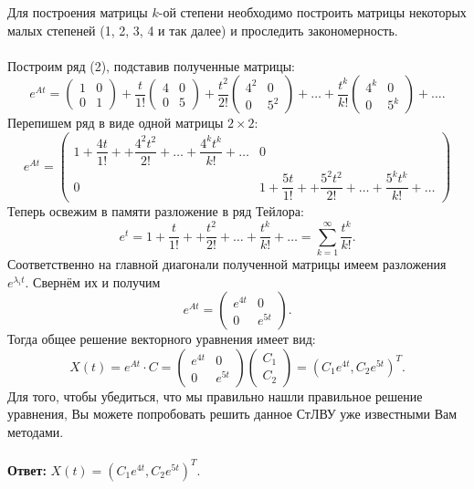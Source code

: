 \documentclass[a4paper, 12pt]{article}
\begin{document}
Для построения матрицы $k$-ой степени необходимо построить матрицы некоторых малых степеней (1, 2, 3, 4 и так далее) и проследить закономерность.\\\\
Построим ряд (2), подставив полученные матрицы:
$$e^{At} = \begin{pmatrix}
	1 & 0\\
	0 & 1
\end{pmatrix} + \dfrac{t}{1!}\begin{pmatrix}
4 & 0 \\
0 & 5
\end{pmatrix} +\dfrac{t^2}{2!}\begin{pmatrix}
4^2 & 0 \\
0 & 5^2
\end{pmatrix} + \ldots + \dfrac{t^k}{k!}\begin{pmatrix}
4^k & 0 \\
0 & 5^k
\end{pmatrix} + \ldots.$$
Перепишем ряд в виде одной матрицы $2\times2$:
$$e^{At} = \begin{pmatrix}
	1 + \dfrac{4t}{1!} + + \dfrac{4^2t^2}{2!} + \ldots + \dfrac{4^kt^k}{k!} + \ldots & 0\\
	0 &  1 + \dfrac{5t}{1!} + + \dfrac{5^2t^2}{2!} + \ldots + \dfrac{5^kt^k}{k!} + \ldots
\end{pmatrix}$$
Теперь освежим в памяти разложение в ряд Тейлора:
$$e^t = 1 + \dfrac{t}{1!} + + \dfrac{t^2}{2!} + \ldots + \dfrac{t^k}{k!} + \ldots = \sum_{k = 1}^{\infty}\dfrac{t^k}{k!}.$$
Соответственно на главной диагонали полученной матрицы имеем разложения $e^{\lambda_it}$. Свернём их и получим
$$e^{At} = \begin{pmatrix}
	e^{4t} & 0\\
	0 & e^{5t}
\end{pmatrix}.$$
Тогда общее решение векторного уравнения имеет вид:
$$X(t) = e^{At}\cdot C =  \begin{pmatrix}
	e^{4t} & 0\\
	0 & e^{5t}
\end{pmatrix}\begin{pmatrix}
C_1\\C_2
\end{pmatrix} = (C_1e^{4t}, C_2e^{5t})^T.$$
Для того, чтобы убедиться, что мы правильно нашли правильное решение уравнения, Вы можете попробовать решить данное СтЛВУ уже известными Вам методами.\\\\
\textbf{Ответ:} $X(t) = (C_1e^{4t}, C_2e^{5t})^T.$\\\\
\end{document}
